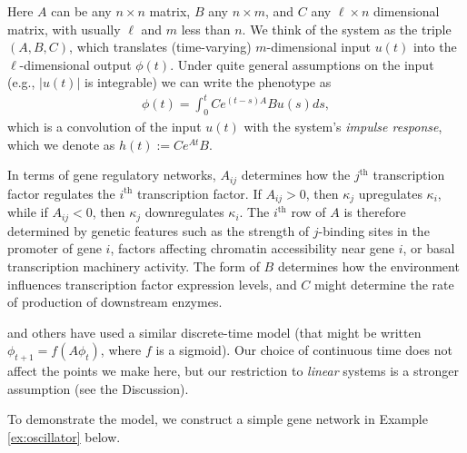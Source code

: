 \documentclass{article}
\newcommand{\1}{\mathbbm{1}}
\begin{document}
Here $A$ can be any $n \times n$ matrix, $B$ any $n \times m$, and $C$ any $\ell \times n$ dimensional matrix,
with usually $\ell$ and $m$ less than $n$.
We think of the system as the triple $(A,B,C)$,
which translates (time-varying) $m$-dimensional input $u(t)$
into the $\ell$-dimensional output $\phi(t)$.
Under quite general assumptions on the input
(e.g., $|u(t)|$ is integrable) 
we can write the phenotype as 
  \begin{align}
    \phi(t) = \int_{0}^{t} C e^{(t-s) A} B u(s) ds ,
  \end{align}
which is a convolution of the input $u(t)$ with the system's \emph{impulse response},
which we denote as $h(t) := Ce^{A t}B$.

In terms of gene regulatory networks, $A_{ij}$ determines how the $j^\text{th}$ transcription factor regulates the $i^\text{th}$ transcription factor.
If $A_{ij} > 0$, then $\kappa_j$ upregulates $\kappa_i$, while if $A_{ij} < 0$, then $\kappa_j$ downregulates $\kappa_i$.
The $i^\text{th}$ row of $A$ is therefore determined by genetic features such as
the strength of $j$-binding sites in the promoter of gene $i$,
factors affecting chromatin accessibility near gene $i$,
or basal transcription machinery activity.
The form of $B$ determines how the environment influences transcription factor expression levels,
and $C$ might determine the rate of production of downstream enzymes.


\citet{wagner1994evolution} and others have used a similar discrete-time model 
(that might be written $\phi_{t+1} = f(A \phi_t)$, where $f$ is a sigmoid).
Our choice of continuous time does not affect the points we make here,
but our restriction to \emph{linear} systems is a stronger assumption
(see the Discussion).

To demonstrate the model,
we construct a simple gene network in Example \ref{ex:oscillator} below.
\end{document}
